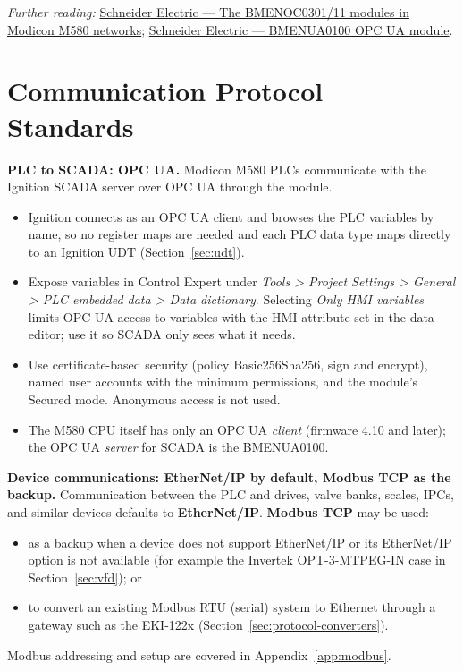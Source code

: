 \textit{Further reading:} \href{https://filedn.eu/l6oFb0aAwOAyRLLaUMiUmzz/CE_HELP/eng/BMENOC03x1/BMENOC03x1_D-SE-0035359.htm}{Schneider Electric --- The BMENOC0301/11 modules in Modicon M580 networks}; \href{https://www.se.com/us/en/product/BMENUA0100/communication-module-modicon-m580-opc-ua/}{Schneider Electric --- BMENUA0100 OPC UA module}.

\section{Communication Protocol Standards}\label{sec:protocols}
\textbf{PLC to SCADA: OPC UA.} Modicon M580 PLCs communicate with the Ignition SCADA server over OPC UA through the  module.
\begin{itemize}[itemsep=1pt]
  \item Ignition connects as an OPC UA client and browses the PLC variables by name, so no register maps are needed and each PLC data type maps directly to an Ignition UDT (Section~\ref{sec:udt}).
  \item Expose variables in Control Expert under \textit{Tools \textgreater{} Project Settings \textgreater{} General \textgreater{} PLC embedded data \textgreater{} Data dictionary}. Selecting \textit{Only HMI variables} limits OPC UA access to variables with the HMI attribute set in the data editor; use it so SCADA only sees what it needs.
  \item Use certificate-based security (policy Basic256Sha256, sign and encrypt), named user accounts with the minimum permissions, and the module's Secured mode. Anonymous access is not used.
  \item The M580 CPU itself has only an OPC UA \emph{client} (firmware 4.10 and later); the OPC UA \emph{server} for SCADA is the BMENUA0100.
\end{itemize}

\textbf{Device communications: EtherNet/IP by default, Modbus TCP as the backup.} Communication between the PLC and drives, valve banks, scales, IPCs, and similar devices defaults to \textbf{EtherNet/IP}. \textbf{Modbus TCP} may be used:
\begin{itemize}[itemsep=1pt]
  \item as a backup when a device does not support EtherNet/IP or its EtherNet/IP option is not available (for example the Invertek OPT-3-MTPEG-IN case in Section~\ref{sec:vfd}); or
  \item to convert an existing Modbus RTU (serial) system to Ethernet through a gateway such as the EKI-122x (Section~\ref{sec:protocol-converters}).
\end{itemize}
Modbus addressing and setup are covered in Appendix~\ref{app:modbus}.

